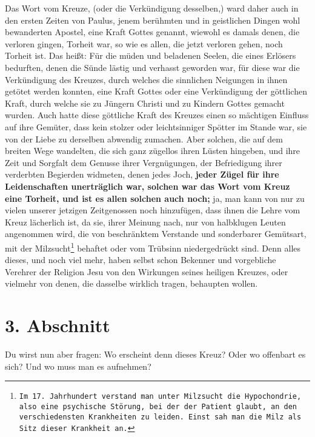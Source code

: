 Das Wort vom Kreuze, (oder die Verkündigung desselben,) ward daher auch in den
ersten Zeiten von Paulus, jenem berühmten und in geistlichen Dingen wohl
bewanderten Apostel, eine Kraft Gottes genannt, wiewohl es damals denen, die
verloren gingen, Torheit war, so wie es allen, die jetzt verloren gehen, noch
Torheit ist. Das heißt: Für die müden und beladenen Seelen, die eines Erlösers
bedurften, denen die Sünde lästig und verhasst geworden war, für diese war die
Verkündigung des Kreuzes, durch welches die sinnlichen Neigungen in ihnen
getötet werden konnten, eine Kraft Gottes oder eine Verkündigung der göttlichen
Kraft, durch welche sie zu Jüngern Christi und zu Kindern Gottes gemacht wurden.
Auch hatte diese göttliche Kraft des Kreuzes einen so mächtigen Einfluss auf
ihre
Gemüter, dass kein stolzer oder leichtsinniger Spötter im Stande war, sie von
der Liebe zu derselben abwendig zumachen. Aber solchen, die auf dem breiten Wege
wandelten, die sich ganz zügellos ihren Lüsten hingeben, und ihre Zeit und
Sorgfalt dem Genusse ihrer Vergnügungen, der Befriedigung ihrer verderbten
Begierden widmeten, denen jedes Joch, \label{ref:03_02_leidenschaft}
\textbf{jeder Zügel für ihre Leidenschaften
unerträglich war, solchen war das Wort vom Kreuz eine Torheit, und ist es
allen solchen auch noch;} ja, man kann von nur zu vielen unserer jetzigen
Zeitgenossen noch hinzufügen, dass ihnen die Lehre vom Kreuz lächerlich ist, da
sie, ihrer Meinung nach, nur von halbklugen Leuten angenommen wird, die von
beschränktem Verstande und sonderbarer Gemütsart, mit der
Milzsucht\footnote{\texttt{Im 17. Jahrhundert verstand man unter Milzsucht die
Hypochondrie, also eine psychische Störung, bei der der Patient glaubt, an den
verschiedensten Krankheiten zu leiden. Einst sah man die Milz als Sitz dieser
Krankheit an.}} behaftet
oder vom Trübsinn niedergedrückt sind. Denn alles dieses, und noch viel mehr,
haben selbst schon Bekenner und vorgebliche Verehrer der Religion Jesu von den
Wirkungen seines heiligen Kreuzes, oder vielmehr von denen, die dasselbe
wirklich tragen, behaupten wollen.

\section{3. Abschnitt} \label{kap3_ab3}

Du wirst nun aber fragen: Wo erscheint denn dieses Kreuz? Oder wo offenbart es
sich? Und wo muss man es aufnehmen?

\medskip

